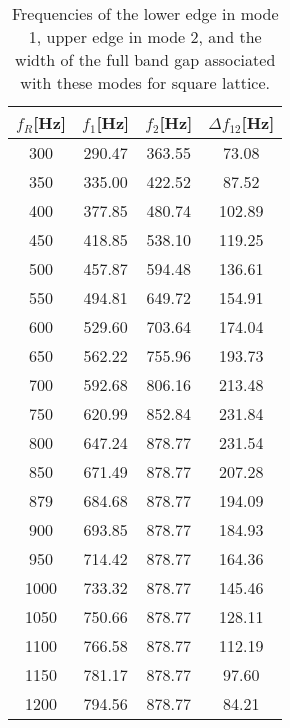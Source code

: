 \documentclass{article}
\begin{document}
\begin{table}[htb]
\centering
\caption{Frequencies of the lower edge in mode 1, upper edge in mode 2, and the width of the full band gap associated with these modes for square lattice.}
\label{tab100}
\begin{tabular}{cccc}
\hline
$f_R$[Hz] & $f_1$[Hz] & $f_2$[Hz] & $\Delta f _{12}$[Hz] \\ \hline
300 & 290.47 & 363.55 & 73.08 \\ \hline
350 & 335.00 & 422.52 & 87.52 \\ \hline
400 & 377.85 & 480.74 & 102.89 \\ \hline
450 & 418.85 & 538.10 & 119.25 \\ \hline
500 & 457.87 & 594.48 & 136.61 \\ \hline
550 & 494.81 & 649.72 & 154.91 \\ \hline
600 & 529.60 & 703.64 & 174.04 \\ \hline
650 & 562.22 & 755.96 & 193.73 \\ \hline
700 & 592.68 & 806.16 & 213.48 \\ \hline
750 & 620.99 & 852.84 & 231.84 \\ \hline
800 & 647.24 & 878.77 & 231.54 \\ \hline
850 & 671.49 & 878.77 & 207.28 \\ \hline
879 & 684.68 & 878.77 & 194.09 \\ \hline
900 & 693.85 & 878.77 & 184.93 \\ \hline
950 & 714.42 & 878.77 & 164.36 \\ \hline
1000 & 733.32 & 878.77 & 145.46 \\ \hline
1050 & 750.66 & 878.77 & 128.11 \\ \hline
1100 & 766.58 & 878.77 & 112.19 \\ \hline
1150 & 781.17 & 878.77 & 97.60 \\ \hline
1200 & 794.56 & 878.77 & 84.21 \\ \hline
\end{tabular}
\end{table}
\end{document}
